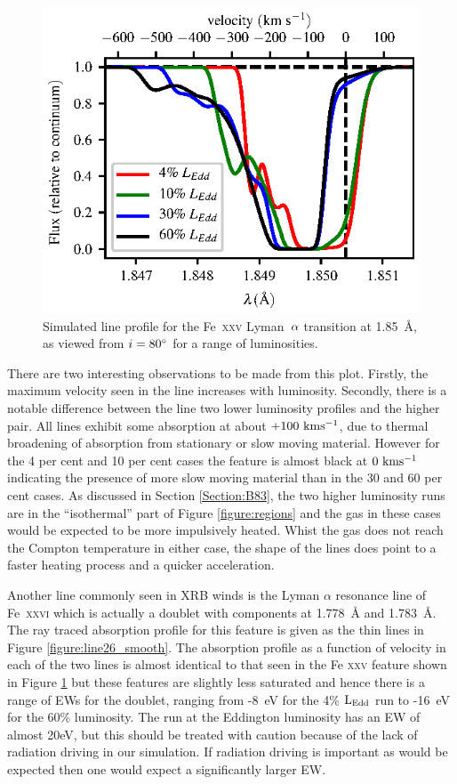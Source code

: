 \documentclass[a4paper,fleqn,usenatbib]{mnras}
\begin{document}
\begin{figure}
\includegraphics[width=\columnwidth]{figures/80_degrees_fe25.eps}
\caption{Simulated line profile for the Fe~\textsc{xxv} Lyman~$\rm{\alpha}$
transition at 1.85~{\AA}, as viewed from $i = 80\degree$ for a range
of luminosities.}
\label{figure:line25}
\end{figure}

There are two interesting observations to be made from this plot. Firstly, the maximum velocity seen in 
the line increases with luminosity. Secondly, there is a notable difference between the line two lower luminosity 
profiles and the higher pair. All lines exhibit some absorption at about $\rm{+100~kms^{-1}}$, due to thermal 
broadening of absorption from stationary or slow moving material. However for the 4 per cent and 10 per cent 
cases the feature is almost black at $\rm{0~kms^{-1}}$ indicating the presence of more slow moving material than 
in the 30 and 60 per cent cases. As discussed in Section \ref{Section:B83}, the two higher luminosity runs
are in the ``isothermal'' part of Figure \ref{figure:regions} and the gas in these cases would be expected to 
be more impulsively heated. Whist the gas does not reach the Compton temperature in either case, the 
shape of the lines does point to a faster heating process and a quicker acceleration. 


Another line commonly seen in XRB winds is the Lyman $\alpha$ resonance 
line of Fe~\textsc{xxvi} which is actually a doublet with components at
1.778~{\AA} and 1.783~{\AA}. The ray traced absorption profile for this 
feature is given as the thin lines in Figure \ref{figure:line26_smooth}. The absorption profile
as a function of velocity in each of the two lines is almost identical to that seen in the 
Fe \textsc{xxv} feature shown in Figure \ref{figure:line25} but these features
are slightly less
saturated and hence there is a range of EWs for the doublet, ranging from -8~eV for the 4\% $\rm{L_{Edd}}$
run to -16~eV for the 60\% luminosity. The run at the Eddington luminosity 
has an EW of almost 20eV, but this should be treated with caution because of the lack
of radiation driving in our simulation. If radiation driving is important as would be expected then one would expect
a significantly larger EW.
\end{document}
